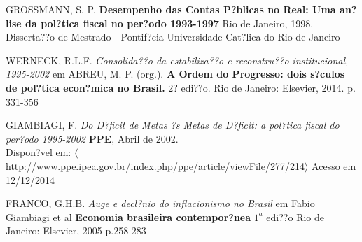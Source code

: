 \documentclass{article}
\begin{document}
\begin{thebibliography}{16}
 

GROSSMANN, S. P.
\textbf{Desempenho das Contas P?blicas no Real: Uma an?lise da pol?tica fiscal no per?odo 1993-1997}
Rio de Janeiro, 1998. Disserta??o de Mestrado - Pontif?cia Universidade Cat?lica do Rio de Janeiro

WERNECK, R.L.F. \emph{Consolida??o da estabiliza??o e  reconstru??o institucional, 1995-2002} em 
ABREU, M. P. (org.). 
\textbf{A Ordem do Progresso: dois s?culos de pol?tica econ?mica no Brasil.}
2? edi??o.
Rio de Janeiro: Elsevier,
2014. p. 331-356

GIAMBIAGI, F.
\emph{Do D?ficit de Metas ?s Metas de D?ficit: a pol?tica fiscal do per?odo 1995-2002}
\textbf{PPE}, 
Abril de 2002. \\
Dispon?vel em: $\langle$http://www.ppe.ipea.gov.br/index.php/ppe/article/viewFile/277/214$\rangle$
Acesso em 12/12/2014

FRANCO, G.H.B.
\emph{Auge e decl?nio do inflacionismo no Brasil} em Fabio Giambiagi et al
\textbf{Economia brasileira contempor?nea}
$1^a$ edi??o
Rio de Janeiro: Elsevier, 
2005 p.258-283 


\end{thebibliography}
\end{document}
